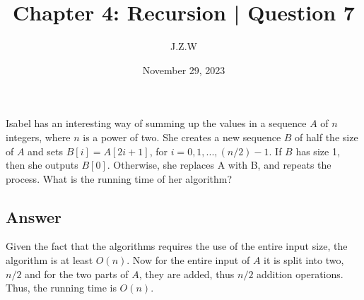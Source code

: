\documentclass{article}
\begin{document}
\title{Chapter 4: Recursion | Question 7}
\author{J.Z.W}
\date{November 29, 2023}

\maketitle

\setcounter{section}{6}

\section{}

Isabel has an interesting way of summing up the values in a sequence \(A\)
of \(n\) integers, where \(n\) is a power of two. She creates a new sequence
\(B\) of half the size of \(A\) and sets \(B[i] = A[2i + 1]\), for 
\(i = 0, 1, ..., (n/2) - 1\). If \(B\) has size 1, then she outputs \(B[0]\).
Otherwise, she replaces A with B, and repeats the process. What is the running
time of her algorithm?

\subsection{Answer}

\begin{mdframed}

  Given the fact that the algorithms requires the use of the entire input size,
  the algorithm is at least \(O(n)\). Now for the entire input of \(A\) it is split
  into two, \(n/2\) and for the two parts of \(A\), they are added, thus \(n/2\) addition
  operations. Thus, the running time is \(O(n)\). 

\end{mdframed}
\end{document}
